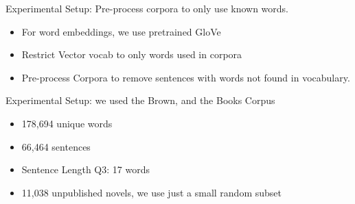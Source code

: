 \documentclass[]{beamer}
\begin{document}
\begin{frame}{Experimental Setup: Pre-process corpora to only use known words.}
	\begin{itemize}
		\item<1-> For word embeddings, we use pretrained GloVe 
		\item<2-> Restrict Vector vocab to only words used in corpora
		\item<2-> Pre-process Corpora to remove sentences with words not found in vocabulary.
	\end{itemize}
\end{frame}

\begin{frame}{Experimental Setup: we used the Brown, and the Books Corpus}

	\begin{itemize}
		\item 178,694 unique words
		\item 66,464 sentences 
		\item Sentence Length Q3: 17 words
		\item 11,038 unpublished novels, we use just a small random subset
	\end{itemize}

\end{frame}
\end{document}
